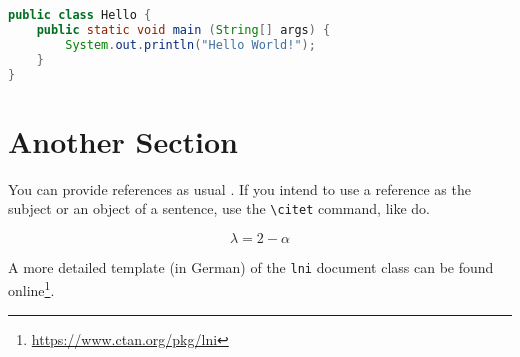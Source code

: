 \documentclass[english,utf8,biblatex]{lni}
\begin{document}
\begin{lstlisting}[caption={A listing with a caption}, label=L1, language=Java]
public class Hello {
    public static void main (String[] args) {
        System.out.println("Hello World!");
    }
}
\end{lstlisting}

\section{Another Section}
\label{sec:demos}
You can provide references as usual \cite{Gl01}. If you intend to use a reference as the subject or an object of a sentence, use the \texttt{\textbackslash{}citet} command, like \citet{ABC01} do.

\begin{equation}
  \lambda = 2 - \alpha
\end{equation}

A more detailed template (in German) of the \texttt{lni} document class can be found online\footnote{\url{https://www.ctan.org/pkg/lni}}.

\printbibliography
\end{document}
